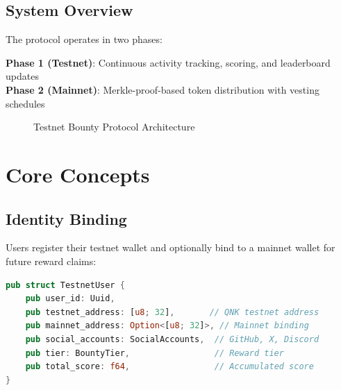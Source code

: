 \documentclass[11pt,a4paper]{article}
\begin{document}
\subsection{System Overview}

The protocol operates in two phases:

\textbf{Phase 1 (Testnet)}: Continuous activity tracking, scoring, and leaderboard updates \\
\textbf{Phase 2 (Mainnet)}: Merkle-proof-based token distribution with vesting schedules

\begin{figure}[h]
\centering
{}
\caption{Testnet Bounty Protocol Architecture}
\end{figure}

\section{Core Concepts}

\subsection{Identity Binding}

Users register their testnet wallet and optionally bind to a mainnet wallet for future reward claims:

\begin{lstlisting}[language=rust]
pub struct TestnetUser {
    pub user_id: Uuid,
    pub testnet_address: [u8; 32],       // QNK testnet address
    pub mainnet_address: Option<[u8; 32]>, // Mainnet binding
    pub social_accounts: SocialAccounts,  // GitHub, X, Discord
    pub tier: BountyTier,                 // Reward tier
    pub total_score: f64,                 // Accumulated score
}
\end{lstlisting}
\end{document}
